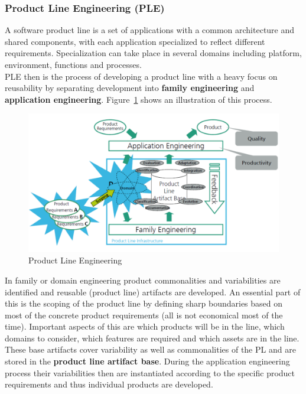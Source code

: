 \subsubsection{Product Line Engineering (PLE)}
A software product line is a set of applications with a common architecture and shared components, with each application specialized to reflect different requirements.
Specialization can take place in several domains including platform, environment, functions and processes.\\
PLE then is the process of developing a product line with a heavy focus on reusability by separating development into \textbf{family engineering} and \textbf{application engineering}.
Figure~\ref{fig:product_line_engineering} shows an illustration of this process.
\begin{figure}[h]
  \centering
  \includegraphics[width=.7\textwidth]{images/product_line_engineering.png}
  \caption{Product Line Engineering}\label{fig:product_line_engineering}
\end{figure}
In family or domain engineering product commonalities and variabilities are identified and reusable (product line) artifacts are developed.
An essential part of this is the scoping of the product line by defining sharp boundaries based on most of the concrete product requirements (all is not economical most of the time).
Important aspects of this are which products will be in the line, which domains to consider, which features are required and which assets are in the line.
These base artifacts cover variability as well as commonalities of the PL and are stored in the \textbf{product line artifact base}.
During the application engineering process their variabilities then are instantiated according to the specific product requirements and thus individual products are developed.\\

